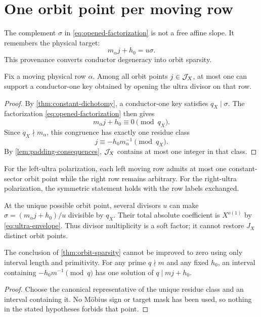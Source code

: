 \section{One orbit point per moving row}
\label{sec:orbit-sparsity}

The complement \(\sigma\) in \eqref{eq:opened-factorization} is not a
free affine slope.  It remembers the physical target:
\[
 m_\alpha j+h_0=u\sigma.
\]
This provenance converts conductor degeneracy into orbit sparsity.

\begin{theorem}
\label{thm:orbit-sparsity}
Fix a moving physical row \(\alpha\).  Among all orbit points
\(j\in\mathcal J_X\), at most one can support a conductor-one key
obtained by opening the ultra divisor on that row.
\end{theorem}

\begin{proof}
By \cref{thm:constant-dichotomy}, a conductor-one key satisfies
\(q_X\mid\sigma\).  The factorization
\eqref{eq:opened-factorization} then gives
\begin{equation}
 m_\alpha j+h_0\equiv0\pmod{q_X}.
\label{eq:orbit-congruence}
\end{equation}
Since \(q_X\nmid m_\alpha\), this congruence has exactly one residue
class
\[
 j\equiv-h_0m_\alpha^{-1}\pmod{q_X}.
\]
By \cref{lem:padding-consequences}, \(\mathcal J_X\) contains at most one
integer in that class.
\end{proof}

\begin{corollary}
\label{cor:both-polarizations-sparse}
For the left-ultra polarization, each left moving row admits at most
one constant-sector orbit point while the right row remains arbitrary.
For the right-ultra polarization, the symmetric statement holds with
the row labels exchanged.
\end{corollary}

\begin{remark}
\label{rem:divisor-choices}
At the unique possible orbit point, several divisors \(u\) can make
\(\sigma=(m_\alpha j+h_0)/u\) divisible by \(q_X\).  Their total
absolute coefficient is \(X^{o(1)}\) by
\eqref{eq:ultra-envelope}.  Thus divisor multiplicity is a soft
factor; it cannot restore \(J_X\) distinct orbit points.
\end{remark}

\begin{proposition}
\label{prop:one-point-sharp}
The conclusion of \cref{thm:orbit-sparsity} cannot be improved to
zero using only interval length and primitivity.  For any prime
\(q\nmid m\) and any fixed \(h_0\), an interval containing
\(-h_0m^{-1}\pmod q\) has one solution of
\(q\mid mj+h_0\).
\end{proposition}

\begin{proof}
Choose the canonical representative of the unique residue class and
an interval containing it.  No M\"obius sign or target mask has been
used, so nothing in the stated hypotheses forbids that point.
\end{proof}
